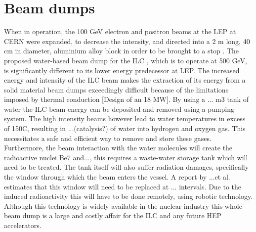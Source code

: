 \documentclass[%
 onecolumn,notitlepage,
 amsmath,amssymb,
 aps,
 longbibliography
]{revtex4-1}
\begin{document}
\section{Beam dumps}\vspace{-8pt}

When in operation, the 100 GeV electron and positron beams at the LEP at CERN were expanded, to decrease the intensity, and directed into a 2 m long, 40 cm in diameter, aluminium alloy block in order to be brought to a stop \cite{LEP_dump}. The proposed water-based beam dump for the ILC \cite{Satyamurthy2012}, which is to operate at 500 GeV, is significantly different to its lower energy predecessor at LEP. The increased energy and intensity of the ILC beam makes the extraction of its energy from a solid material beam dumps exceedingly difficult because of the limitations imposed by thermal conduction [Design of an 18 MW]. By using a ... m3 tank of water the ILC beam energy can be deposited and removed using a pumping system. The high intensity beams however lead to water temperatures in excess of 150C, resulting in ...(catalysis?) of water into hydrogen and oxygen gas. This necessitates a safe and efficient way to remove and store these gases. Furthermore, the beam interaction with the water molecules will create the radioactive nuclei Be7 and..., this requires a waste-water storage tank which will need to be treated. The tank itself will also suffer radiation damages, specifically the window through which the beam enters the vessel. A report by ...et al. \cite{Satyamurthy2012} estimates that this window will need to be replaced at ... intervals. Due to the induced radioactivity this will have to be done remotely, using robotic technology. Although this technology is widely available in the nuclear industry this whole beam dump is a large and costly affair for the ILC and any future HEP accelerators. \\
\end{document}
